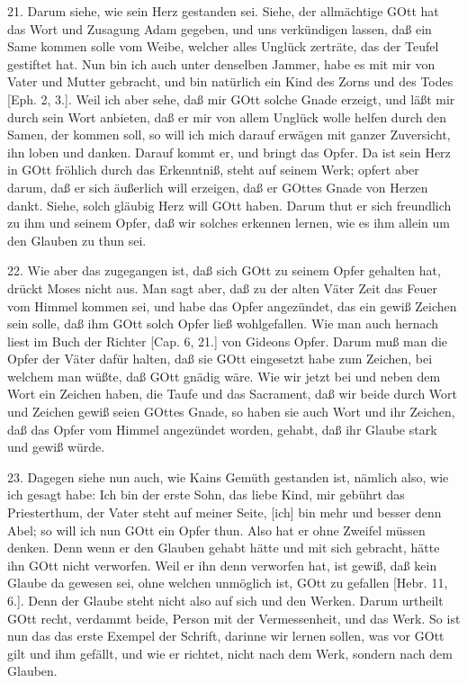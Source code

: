 21. Darum siehe, wie sein Herz gestanden sei. Siehe, der allmächtige GOtt hat das Wort und Zusagung Adam gegeben, und uns verkündigen lassen, daß ein Same kommen solle vom Weibe, welcher alles Unglück zerträte, das der Teufel gestiftet hat. Nun bin ich auch unter denselben Jammer, habe es mit mir von Vater und Mutter gebracht, und bin natürlich ein Kind des Zorns und des Todes [Eph. 2, 3.]. Weil ich aber sehe, daß mir GOtt solche Gnade erzeigt, und läßt mir durch sein Wort anbieten, daß er mir von allem Unglück wolle helfen durch den Samen, der kommen soll, so will ich mich darauf erwägen mit ganzer Zuversicht, ihn loben und danken. Darauf kommt er, und bringt das Opfer. Da ist sein Herz in GOtt fröhlich durch das Erkenntniß, steht auf seinem Werk; opfert aber darum, daß er sich äußerlich will erzeigen, daß er GOttes Gnade von Herzen dankt. Siehe, solch gläubig Herz will GOtt haben. Darum thut er sich freundlich zu ihm und seinem Opfer, daß wir solches erkennen lernen, wie es ihm allein um den Glauben zu thun sei.

22. Wie aber das zugegangen ist, daß sich GOtt zu seinem Opfer gehalten hat, drückt Moses nicht aus. Man sagt aber, daß zu der alten Väter Zeit das Feuer vom Himmel kommen sei, und habe das Opfer angezündet, das ein gewiß Zeichen sein solle, daß ihm GOtt solch Opfer ließ wohlgefallen. Wie man auch hernach liest im Buch der Richter [Cap. 6, 21.] von Gideons Opfer. Darum muß man die Opfer der Väter dafür halten, daß sie GOtt eingesetzt habe zum Zeichen, bei welchem man wüßte, daß GOtt gnädig wäre. Wie wir jetzt bei und neben dem Wort ein Zeichen haben, die Taufe und das Sacrament, daß wir beide durch Wort und Zeichen gewiß seien GOttes Gnade, so haben sie auch Wort und ihr Zeichen, daß das Opfer vom Himmel angezündet worden, gehabt, daß ihr Glaube stark und gewiß würde.

23. Dagegen siehe nun auch, wie Kains Gemüth gestanden ist, nämlich also, wie ich gesagt habe: Ich bin der erste Sohn, das liebe Kind, mir gebührt das Priesterthum, der Vater steht auf meiner Seite, [ich] bin mehr und besser denn Abel; so will ich nun GOtt ein Opfer thun. Also hat er ohne Zweifel müssen denken. Denn wenn er den Glauben gehabt hätte und mit sich gebracht, hätte ihn GOtt nicht verworfen. Weil er ihn denn verworfen hat, ist gewiß, daß kein Glaube da gewesen sei, ohne welchen unmöglich ist, GOtt zu gefallen [Hebr. 11, 6.]. Denn der Glaube steht nicht also auf sich und den Werken. Darum urtheilt GOtt recht, verdammt beide, Person mit der Vermessenheit, und das Werk. So ist nun das das erste Exempel der Schrift, darinne wir lernen sollen, was vor GOtt gilt und ihm gefällt, und wie er richtet, nicht nach dem Werk, sondern nach dem Glauben.

